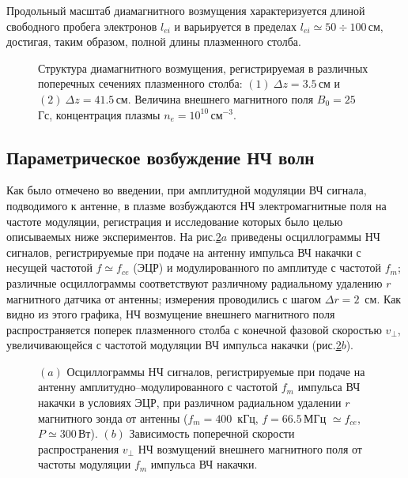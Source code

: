 \documentclass[autoref,10pt]{disser}
\begin{document}
Продольный масштаб диамагнитного возмущения характеризуется длиной свободного пробега электронов $l_{ei}$ и варьируется в пределах $l_{ei}\simeq{}50\div{}100$\,см, достигая, таким образом, полной длины плазменного столба. 

\begin{figure}[H]
    \centering
    \def\svgwidth{0.75\columnwidth} %
    
    \caption{Структура диамагнитного возмущения, регистрируемая в различных поперечных сечениях плазменного столба: $(1)\ {}\Delta{}z=3.5$\,см и $(2)\ {}\Delta{}z=41.5$\,см. Величина внешнего магнитного поля $B_{0}=25$\, Гс, концентрация плазмы $n_{e}=10^{10}$\,см$^{-3}$.}
    \label{fig:pic1HARM_L3+L1RAD}
\end{figure}

\subsection{Параметрическое возбуждение НЧ волн}
Как было отмечено во введении, при амплитудной модуляции ВЧ сигнала, подводимого к антенне, в плазме возбуждаются НЧ электромагнитные поля на частоте модуляции, регистрация и исследование которых было целью описываемых ниже экспериментов.
На \mbox{рис.\ref{fig:phase_composite}$a$} приведены  осциллограммы НЧ сигналов, регистрируемые при подаче на антенну импульса ВЧ накачки с несущей частотой $f\simeq{}f_{ce}$ (ЭЦР) и модулированного по амплитуде с частотой $f_{m}$; различные осциллограммы соответствуют различному радиальному удалению $r$ магнитного датчика от антенны; измерения проводились с шагом $\Delta{}r = 2$~см. Как видно из этого графика, НЧ возмущение внешнего магнитного поля распространяется поперек плазменного столба с конечной фазовой скоростью $v_{\perp}$, увеличивающейся с частотой модуляции ВЧ импульса накачки (\mbox{рис.\ref{fig:phase_composite}$b$}).
\begin{figure}[H]
  \centering
  \def\svgwidth{0.6\columnwidth} %
  
  \caption{$(a)$ Осциллограммы НЧ сигналов, регистрируемые при подаче на антенну амплитудно--модулированного с частотой $f_{m}$ импульса ВЧ накачки в условиях ЭЦР, при различном радиальном удалении $r$ магнитного зонда от антенны ($f_{m} = 400$\, кГц, $f=66.5$\,МГц $\simeq f_{ce}$, $P\simeq 300$\,Вт). $(b)$ Зависимость поперечной скорости распространения $v_{\perp}$ НЧ возмущений внешнего магнитного поля от частоты модуляции $f_{m}$ импульса ВЧ накачки.}
  \label{fig:phase_composite}
\end{figure} 
\end{document}
